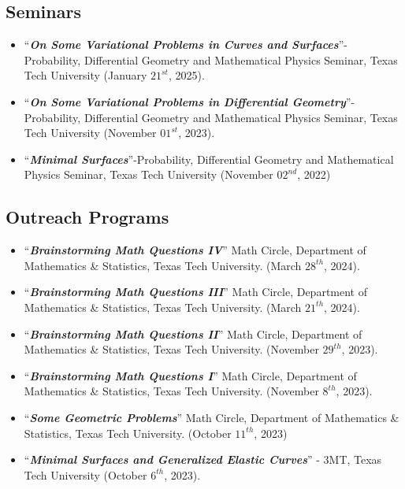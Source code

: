 \documentclass[12pt]{book}
\begin{document}
\subsection*{Seminars}
\begin{itemize}
	\item ``\textit{\textbf{On Some Variational Problems in Curves and Surfaces}}''- Probability, Differential Geometry and Mathematical Physics Seminar, Texas Tech University (January $21^{st}$, 2025).
	\item ``\textit{\textbf{On Some Variational Problems in Differential Geometry}}''- Probability, Differential Geometry and Mathematical Physics Seminar, Texas Tech University (November $01^{st}$, 2023).

\item ``\textit{\textbf{Minimal Surfaces}}''-Probability, Differential Geometry and Mathematical Physics Seminar, Texas Tech University (November $02^{nd}$, 2022)

\end{itemize}


\subsection*{Outreach Programs}
\begin{itemize}
	\item ``\textit{\textbf{Brainstorming Math Questions IV}}'' Math Circle, Department of Mathematics \& Statistics, Texas Tech University. (March $28^{th}$, 2024).
	\item ``\textit{\textbf{Brainstorming Math Questions III}}'' Math Circle, Department of Mathematics \& Statistics, Texas Tech University. (March $21^{th}$, 2024).
\item ``\textit{\textbf{Brainstorming Math Questions II}}'' Math Circle, Department of Mathematics \& Statistics, Texas Tech University. (November $29^{th}$, 2023).
\item ``\textit{\textbf{Brainstorming Math Questions I}}'' Math Circle, Department of Mathematics \& Statistics, Texas Tech University. (November $8^{th}$, 2023). 
\item ``\textit{\textbf{Some Geometric Problems}}'' Math Circle, Department of Mathematics \& Statistics, Texas Tech University. (October $11^{th}$, 2023)
\item ``\textit{\textbf{Minimal Surfaces and Generalized Elastic Curves}}'' - 3MT, Texas Tech University (October $6^{th}$, 2023).

\end{itemize}
\end{document}

